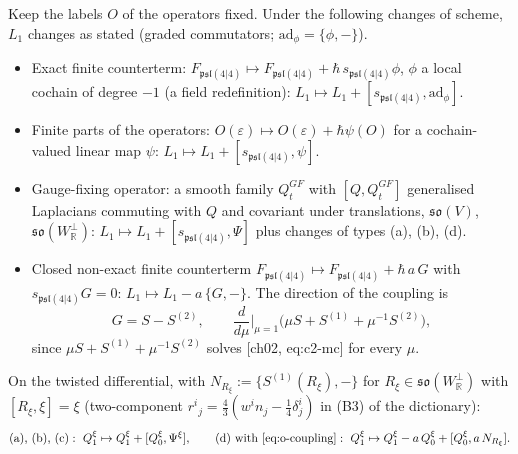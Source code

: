 \begin{proposition}
\label{prop:o-laws}
Keep the labels $O$ of the operators fixed. Under the following changes of scheme, $L_1$ changes as stated (graded commutators; $\mathrm{ad}_\phi=\{\phi,-\}$).
\begin{itemize}
\item[(a)] Exact finite counterterm: $F_{\mathfrak{psl}(4|4)}\mapsto F_{\mathfrak{psl}(4|4)}+\hbar\,s_{\mathfrak{psl}(4|4)}\phi$, $\phi$ a local cochain of degree $-1$ (a field redefinition): $L_1\mapsto L_1+[s_{\mathfrak{psl}(4|4)},\mathrm{ad}_\phi]$.
\item[(b)] Finite parts of the operators: $O(\varepsilon)\mapsto O(\varepsilon)+\hbar\psi(O)$ for a cochain-valued linear map $\psi$: $L_1\mapsto L_1+[s_{\mathfrak{psl}(4|4)},\psi]$.
\item[(c)] Gauge-fixing operator: a smooth family $Q^{GF}_t$ with $[Q,Q^{GF}_t]$ generalised Laplacians commuting with $Q$ and covariant under translations, $\mathfrak{so}(V)$, $\mathfrak{so}(W_{\mathbb R}^\perp)$: $L_1\mapsto L_1+[s_{\mathfrak{psl}(4|4)},\Psi]$ plus changes of types (a), (b), (d).
\item[(d)] Closed non-exact finite counterterm $F_{\mathfrak{psl}(4|4)}\mapsto F_{\mathfrak{psl}(4|4)}+\hbar\,a\,G$ with $s_{\mathfrak{psl}(4|4)}G=0$: $L_1\mapsto L_1-a\,\{G,-\}$. The direction of the coupling is
\begin{equation}
G=S-S^{(2)},\qquad \frac{d}{d\mu}\Big|_{\mu=1}\big(\mu S+S^{(1)}+\mu^{-1}S^{(2)}\big),
\label{eq:o-coupling}
\end{equation}
since $\mu S+S^{(1)}+\mu^{-1}S^{(2)}$ solves [ch02, eq:c2-mc] for every $\mu$.
\end{itemize}
On the twisted differential, with $N_{R_\xi}:=\{S^{(1)}(R_\xi),-\}$ for $R_\xi\in\mathfrak{so}(W_{\mathbb R}^\perp)$ with $[R_\xi,\xi]=\xi$ (two-component $r^i{}_j=\tfrac43(w^in_j-\tfrac14\delta^i_j)$ in (B3) of the dictionary):
\begin{equation}
\text{(a), (b), (c)}:\ Q_1^\xi\mapsto Q_1^\xi+[Q_0^\xi,\Psi^\xi],\qquad \text{(d) with \eqref{eq:o-coupling}}:\ Q_1^\xi\mapsto Q_1^\xi-a\,Q_0^\xi+[Q_0^\xi,a\,N_{R_\xi}] .
\label{eq:o-twistlaws}
\end{equation}
\end{proposition}


